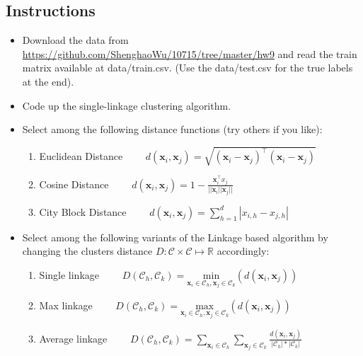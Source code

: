 \documentclass{article}
\begin{document}
\subsection{Instructions}
\begin{itemize}

\item Download the data from \url{https://github.com/ShenghaoWu/10715/tree/master/hw9} and read the train matrix available at data/train.csv. (Use the data/test.csv for the true labels at the end).

\item Code up the single-linkage clustering algorithm.

\item Select among the following distance functions (try others if you like):
\begin{enumerate}
    \item Euclidean Distance $\qquad d(\mathbf{x}_{i}, \mathbf{x}_{j}) = \sqrt{(\mathbf{x}_{i}-\mathbf{x}_{j})^{\intercal}(\mathbf{x}_{i}-\mathbf{x}_{j})}$
    \item Cosine Distance $\qquad d(\mathbf{x}_{i}, \mathbf{x}_{j}) = 1-\frac{\mathbf{x}_{i}^{\intercal}x_{j}}{||\mathbf{x}_{i}||\mathbf{x}_{j}||}$
    \item City Block Distance $\qquad d(\mathbf{x}_{i}, \mathbf{x}_{j})=\sum^{d}_{h=1}|x_{i,h}-x_{j,h}|$
\end{enumerate}

\item Select among the following variants of the Linkage based algorithm by changing the clusters distance $D: \mathcal{C}\times\mathcal{C}\mapsto \mathbb{R}$ accordingly:
    \begin{enumerate}
        \item Single linkage
        $\qquad D(\mathcal{C}_{h}, \mathcal{C}_{k})=\underset{\mathbf{x}_{i}\in \mathcal{C}_{h}, \mathbf{x}_{j}\in \mathcal{C}_{k}}{\text{min}}
            \left(d(\mathbf{x}_{i}, \mathbf{x}_{j})\right)$
        \item Max linkage
        $\qquad D(\mathcal{C}_{h}, \mathcal{C}_{k})=\underset{\mathbf{x}_{i}\in \mathcal{C}_{h}, \mathbf{x}_{j}\in \mathcal{C}_{k}}{\text{max}}
            \left(d(\mathbf{x}_{i}, \mathbf{x}_{j})\right)$
        \item Average linkage
        $\qquad D(\mathcal{C}_{h}, \mathcal{C}_{k})= \sum_{\mathbf{x}_i\in\mathcal{C}_{h}}\sum_{\mathbf{x}_j\in\mathcal{C}_{k}} \frac{d(\mathbf{x}_{i}, \mathbf{x}_{j})}{|\mathcal{C}_{h}|*|\mathcal{C}_{k}|}$
    \end{enumerate}
\end{itemize}
\end{document}
